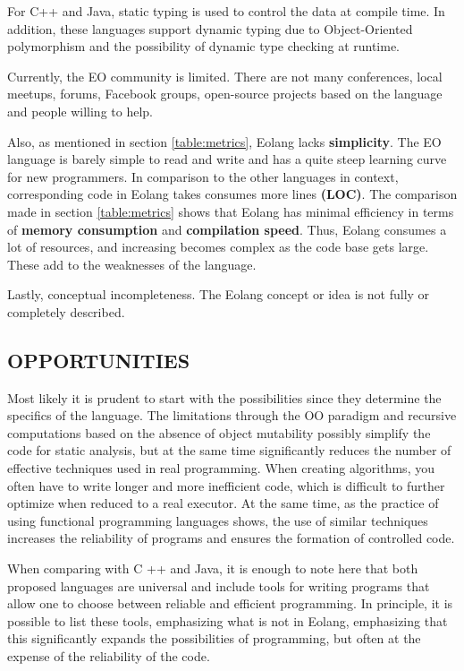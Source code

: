 \documentclass[12pt]{book}
\begin{document}
For C++ and Java, static typing is used to control the data at compile time. In addition, these languages support dynamic typing due to Object-Oriented polymorphism and the possibility of dynamic type checking at runtime.

Currently, the EO community is limited. There are not many conferences, local meetups, forums, Facebook groups, open-source projects based on the language and people willing to help. 

Also, as mentioned in section \ref{table:metrics}, Eolang lacks \textbf{simplicity}. The EO language is barely simple to read and write and has a quite steep learning curve for new programmers. In comparison to the other languages in context, corresponding code in Eolang takes consumes more lines \textbf{(LOC)}. The comparison made in section \ref{table:metrics} shows that Eolang has minimal efficiency in terms of \textbf{memory consumption} and \textbf{compilation speed}. Thus, Eolang consumes a lot of resources, and increasing becomes complex as the code base gets large. These add to the weaknesses of the language.

Lastly, conceptual incompleteness. The Eolang concept or idea is not fully or completely described.

\subsection{OPPORTUNITIES}
Most likely it is prudent to start with the possibilities since they determine the specifics of the language. The limitations through the OO paradigm and recursive computations based on the absence of object mutability possibly simplify the code for static analysis, but at the same time significantly reduces the number of effective techniques used in real programming. When creating algorithms, you often have to write longer and more inefficient code, which is difficult to further optimize when reduced to a real executor. At the same time, as the practice of using functional programming languages shows, the use of similar techniques increases the reliability of programs and ensures the formation of controlled code.

When comparing with C ++ and Java, it is enough to note here that both proposed languages are universal and include tools for writing programs that allow one to choose between reliable and efficient programming. In principle, it is possible to list these tools, emphasizing what is not in Eolang, emphasizing that this significantly expands the possibilities of programming, but often at the expense of the reliability of the code.
\end{document}
